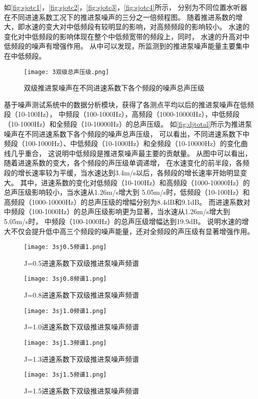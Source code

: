 如\autoref{fig:sjotc1}，\autoref{fig:sjotc2}，\autoref{fig:sjotc3}，\autoref{fig:sjotc4}所示，
分别为不同位置水听器在不同进速系数工况下的推进泵噪声的三分之一倍频程图。
随着推进系数的增大，即水速的变大对中低频段有较明显的影响，对高频频段的影响较小。
水速的变化对中低频段的影响体现在整个中低频宽带的频段上，同时，
水速的升高对中低频段的噪声有增强作用。
从中可以发现，所监测到的推进泵噪声能量主要集中在中低频段。
\begin{figure}[htbp]
    \centering
    \texttt{[image: 3双级总声压级.png]}
    \caption{\label{fig:djtotal}双级推进泵噪声在不同进速系数下各个频段的噪声总声压级}
\end{figure}

基于噪声测试系统中的数据分析模块，获得了各测点平均以后的推进泵噪声在低频段（10-100Hz），
中频段（100-1000Hz），高频段（1000-10000Hz），中低频段（10-1000Hz）和全频段（10-10000Hz）的总声压级。
如\autoref{fig:djtotal}所示为推进泵噪声在不同进速系数下各个频段的噪声总声压级，
可以看出，不同进速系数下中频段（100-1000Hz）、中低频段（10-1000Hz）和全频段（10-10000Hz）的变化曲线几乎重合，
这说明中低频段是推进泵噪声最主要的贡献量。
从图中可以看出，随着进速系数的变大，各个频段的声压级单调递增，
在水速变化的前半段，各频段的增长速率较为平缓，当水速达到3.4m/s以后，各频段的增长速率开始明显变大。
其中，进速系数的变化对低频段（10-100Hz）和高频段（1000-10000Hz）的总声压级影响较小，当水速从1.26m/s增大到
5.05m/s时，低频段（10-100Hz）和高频段（1000-10000Hz）的总声压级的增幅分别为8.4dB和9.1dB。
而进速系数对中频段（100-1000Hz）的总声压级影响更为显著，当水速从1.26m/s增大到5.05m/s时，
中频段（100-1000Hz）的总声压级增幅达到19.9dB。
说明水速的增大不仅会提升低中高三个频段的噪声能量，还对全频段的声压级有显著增强作用。

\begin{figure}[htbp]
    \centering
    \texttt{[image: 3sj0.5频谱1.png]}
    \caption{\label{fig:sj0.5}J=0.5进速系数下双级推进泵噪声频谱}
\end{figure}
\begin{figure}[htbp]
    \centering
    \texttt{[image: 3sj0.8频谱1.png]}
    \caption{\label{fig:sj0.8}J=0.8进速系数下双级推进泵噪声频谱}
\end{figure}
\begin{figure}[htbp]
    \centering
    \texttt{[image: 3sj1.0频谱1.png]}
    \caption{\label{fig:sj1.0}J=1.0进速系数下双级推进泵噪声频谱}
\end{figure}
\begin{figure}[htbp]
    \centering
    \texttt{[image: 3sj1.3频谱1.png]}
    \caption{\label{fig:sj1.3}J=1.3进速系数下双级推进泵噪声频谱}
\end{figure}
\begin{figure}[htbp]
    \centering
    \texttt{[image: 3sj1.5频谱1.png]}
    \caption{\label{fig:sj1.5}J=1.5进速系数下双级推进泵噪声频谱}
\end{figure}

